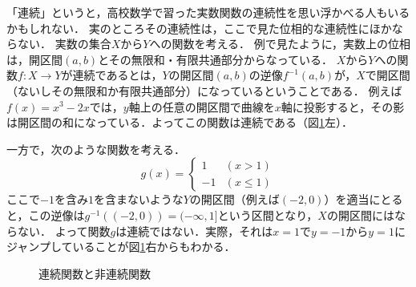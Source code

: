 \documentclass[11pt,a4paper]{jsarticle}
\begin{document}
\begin{develop}
「連続」というと，高校数学で習った実数関数の連続性を思い浮かべる人もいるかもしれない．
実のところその連続性は，ここで見た位相的な連続性にほかならない．
実数の集合$X$から$Y$への関数を考える．
例\label{ex:real}で見たように，実数上の位相は，開区間$(a,b)$とその無限和・有限共通部分からなっている．
$X$から$Y$への関数$f:X \to Y$が連続であるとは，$Y$の開区間$(a,b)$の逆像$f^{-1}(a,b)$が，$X$で開区間（ないしその無限和か有限共通部分）になっているということである．
例えば$f(x) = x^3-2x$では，$y$軸上の任意の開区間で曲線を$x$軸に投影すると，その影は開区間の和になっている．よってこの関数は連続である（図\ref{fig:realcontinuous}左）．

一方で，次のような関数を考える．
\[
g(x) = \left\{
\begin{array}{ll}
1 & (x > 1)\\
-1 & (x \leq 1)
\end{array}
\right. 
\]
ここで$-1$を含み$1$を含まないような$Y$の開区間（例えば$(-2, 0)$）を適当にとると，この逆像は$g^{-1}((-2, 0)) = (-\infty, 1]$という区間となり，$X$の開区間にはならない．
よって関数$g$は連続ではない．実際，それは$x=1$で$y=-1$から$y=1$にジャンプしていることが図\ref{fig:realcontinuous}右からもわかる．
\end{develop}

\begin{figure}[h]
  \begin{minipage}[b]{0.45\linewidth}
    \centering
  \end{minipage}
  \begin{minipage}[b]{0.45\linewidth}
  \end{minipage}
 \caption{連続関数と非連続関数}
 \label{fig:realcontinuous}
\end{figure}
\end{document}
